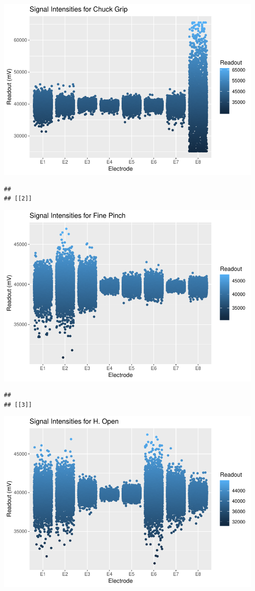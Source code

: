 \documentclass[]{article}
\begin{document}
\includegraphics{Megahand_files/figure-latex/unnamed-chunk-5-1.pdf}

\begin{verbatim}
## 
## [[2]]
\end{verbatim}

\includegraphics{Megahand_files/figure-latex/unnamed-chunk-5-2.pdf}

\begin{verbatim}
## 
## [[3]]
\end{verbatim}

\includegraphics{Megahand_files/figure-latex/unnamed-chunk-5-3.pdf}
\end{document}
